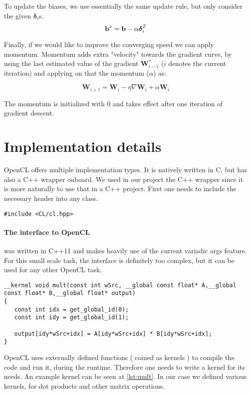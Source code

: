 To update the biases, we use essentially the same update rule, but only consider the given $\boldsymbol{\delta}_{i}$s.
\begin{equation}
\mathbf{b}^{*} = \mathbf{b} - \alpha \boldsymbol{\delta}_i^T\\
\end{equation}

Finally, if we would like to improve the converging speed we can apply momentum. Momentum adds extra "velocity" towards the gradient curve, by using the last estimated value of the gradient $\mathbf{W}^{*}_{i-1}$ ($i$ denotes the current iteration) and applying on that the momentum ($ \alpha$) as:

\begin{equation}
\mathbf{W}_{i+1} = \mathbf{W}_i - \eta \nabla \mathbf{W}_i + \alpha \mathbf{W}_i
\end{equation}

The momentum is initialized with 0 and takes effect after one iteration of gradient descent.

\section{Implementation details}

OpenCL offers multiple implementation types. It is natively written in C, but has also a C++ wrapper onboard. We used in our project the C++ wrapper since it is more naturally to use that in a C++ project.
First one needs to include the necessary header into any class.

\begin{lstlisting}[caption=OpenCL C++ header]
#include <CL/cl.hpp>
\end{lstlisting}


\paragraph{The interface to OpenCL} was written in C++11 and makes heavily use of the current variadic args feature. For this small scale task, the interface is definitely too complex, but it can be used for any other OpenCL task.

\label{lst:mult}
\begin{lstlisting}[caption=Example Kernel function]
__kernel void mult(const int wSrc, __global const float* A,__global const float* B,__global float* output)
{
   const int idx = get_global_id(0);
   const int idy = get_global_id(1);

   output[idy*wSrc+idx] = A[idy*wSrc+idx] * B[idy*wSrc+idx];
}
\end{lstlisting}
OpenCL uses externally defined functions ( coined as kernels ) to compile the code and run it, during the runtime. Therefore one needs to write a kernel for its needs. An example kernel can be seen at \ref{lst:mult}. In our case we defined various kernels, for dot products and other matrix operations.

